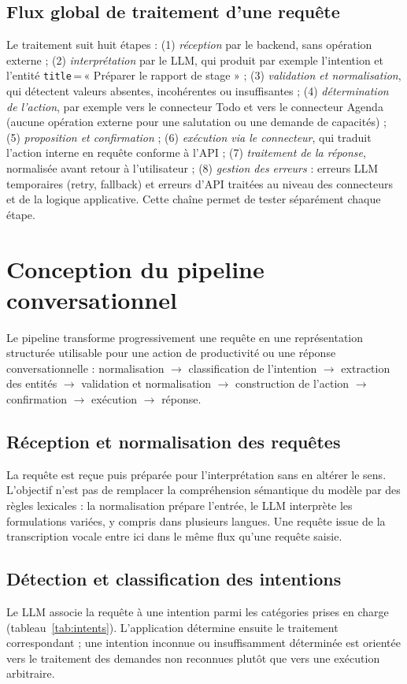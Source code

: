\documentclass[11pt,a4paper,openany,oneside]{report}
\newcommand{\intent}[1]{\texttt{\detokenize{#1}}}
\begin{document}
\subsection{Flux global de traitement d'une requête}
Le traitement suit huit étapes : (1) \emph{réception} par le backend, sans opération externe ; (2) \emph{interprétation} par le LLM, qui produit par exemple l'intention \intent{create_task} et l'entité \texttt{title}\,=\,« Préparer le rapport de stage » ; (3) \emph{validation et normalisation}, qui détectent valeurs absentes, incohérentes ou insuffisantes ; (4) \emph{détermination de l'action}, par exemple \intent{create_task} vers le connecteur Todo et \intent{create_event} vers le connecteur Agenda (aucune opération externe pour une salutation ou une demande de capacités) ; (5) \emph{proposition et confirmation} ; (6) \emph{exécution via le connecteur}, qui traduit l'action interne en requête conforme à l'API ; (7) \emph{traitement de la réponse}, normalisée avant retour à l'utilisateur ; (8) \emph{gestion des erreurs} : erreurs LLM temporaires (retry, fallback) et erreurs d'API traitées au niveau des connecteurs et de la logique applicative. Cette chaîne permet de tester séparément chaque étape.

\section{Conception du pipeline conversationnel}
Le pipeline transforme progressivement une requête en une représentation structurée utilisable pour une action de productivité ou une réponse conversationnelle : normalisation $\rightarrow$ classification de l'intention $\rightarrow$ extraction des entités $\rightarrow$ validation et normalisation $\rightarrow$ construction de l'action $\rightarrow$ confirmation $\rightarrow$ exécution $\rightarrow$ réponse.

\subsection{Réception et normalisation des requêtes}
La requête est reçue puis préparée pour l'interprétation sans en altérer le sens. L'objectif n'est pas de remplacer la compréhension sémantique du modèle par des règles lexicales : la normalisation prépare l'entrée, le LLM interprète les formulations variées, y compris dans plusieurs langues. Une requête issue de la transcription vocale entre ici dans le même flux qu'une requête saisie.

\subsection{Détection et classification des intentions}
Le LLM associe la requête à une intention parmi les catégories prises en charge (tableau~\ref{tab:intents}). L'application détermine ensuite le traitement correspondant ; une intention inconnue ou insuffisamment déterminée est orientée vers le traitement des demandes non reconnues plutôt que vers une exécution arbitraire.
\end{document}
